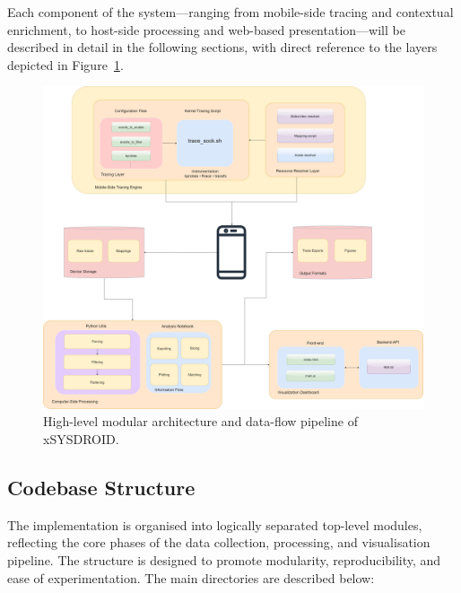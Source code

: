 \documentclass[a4paper,12pt]{report}
\begin{document}
Each component of the system—ranging from mobile-side tracing and contextual enrichment, to host-side processing and web-based presentation—will be described in detail in the following sections, with direct reference to the layers depicted in Figure~\ref{fig:architecture}.
\begin{figure}[H]
\centering
\includegraphics[width=1\textwidth]{architecture.png}
\caption{High-level modular architecture and data-flow pipeline of xSYSDROID.}
\label{fig:architecture}
\end{figure}



\subsection{Codebase Structure}

The implementation is organised into logically separated top-level modules, reflecting the core phases of the data collection, processing, and visualisation pipeline. The structure is designed to promote modularity, reproducibility, and ease of experimentation. The main directories are described below:
\end{document}
